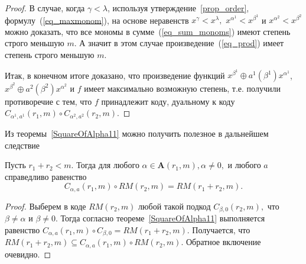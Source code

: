 \begin{proof}
	В случае, когда \(\gamma < \lambda\), используя утверждение~\ref{prop_order}, формулу~(\ref{eq_maxmonom}), на основе неравенств \(x^{\gamma}<x^{\lambda},\) \(x^{\alpha^1}<x^{\beta^1}\) и \(x^{\alpha^2}<x^{\beta^2}\) можно доказать, что все мономы в сумме~(\ref{eq_sum_monoms}) имеют степень строго меньшую \(m\).
	А значит в этом случае произведение~(\ref{eq_prod}) имеет степень строго меньшую \(m\).

	Итак, в конечном итоге доказано, что произведение функций \(x^{\beta^1}\oplus a^1(\beta^1)x^{\alpha^1}\), \(x^{\beta^2} \oplus a^2(\beta^2)x^{\alpha^2}\) и \(f\) имеет максимально возможную степень, т.е.
	получили противоречие с тем, что \(f\) принадлежит коду, дуальному к коду \(C_{\alpha^1,a^1}(r_1,m)\circ C_{\alpha^2,a^2}(r_2,m)\).
\end{proof}

Из теоремы~\ref{SquareOfAlpha11} можно получить полезное в дальнейшем следствие

\begin{corollary}
	\label{th_rm_c_alpha}
	Пусть \(r_1+r_2<m\).
	Тогда для любого \(\alpha\in\mathbf{A}(r_1,m), \alpha\neq 0,\) и любого \(a\) справедливо равенство
	\begin{displaymath}
		C_{\alpha,a}(r_1,m)\circ RM(r_2,m)=RM(r_1+r_2,m).
	\end{displaymath}
\end{corollary}
\begin{proof}
	Выберем в коде \(RM(r_2,m)\) любой такой подкод \(C_{\beta, 0}(r_2,m),\) что \(\beta\neq\alpha\) и \(\beta \neq 0\).
	Тогда согласно теореме~\ref{SquareOfAlpha11} выполняется равенство
	\(C_{\alpha, a}(r_1,m)\circ C_{\beta, 0} = RM(r_1+r_{2}, m).\) Получается, что \(RM(r_{1}+r_{2}, m)\subseteq C_{\alpha,a}(r_1,m)\circ RM(r_2,m).\) Обратное включение очевидно.
\end{proof}

